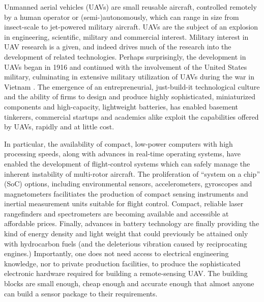 \label{chapter:introduction}

Unmanned aerial vehicles (UAVs) are small reusable aircraft, controlled remotely by a human operator or (semi-)autonomously, which can range in size from insect-scale \cite{Avadhanula2002,Deng2003} to jet-powered military aircraft. UAVs are the subject of an explosion in engineering, scientific, military and commercial interest. Military interest in UAV research is a given, and indeed drives much of the research into the development of related technologies. Perhaps surprisingly, the development in UAVs began in 1916 and continued with the involvement of the United States military, culminating in extensive military utilization of UAVs during the war in Vietnam \cite{Valavanis2007,Cook2007}. The emergence of an entrepreneurial, just-build-it technological culture and the ability of firms to design and produce highly sophisticated, miniaturized components and high-capacity, lightweight batteries, has enabled basement tinkerers, commercial startups and academics alike exploit the capabilities offered by UAVs, rapidly and at little cost.

In particular, the availability of compact, low-power computers with high processing speeds, along with advances in real-time operating systems, have enabled the development of flight-control systems which can safely manage the inherent instability of multi-rotor aircraft. The proliferation of ``system on a chip'' (SoC) options, including environmental sensors, accelerometers, gyroscopes and magnetometers facilitiates the production of compact sensing instruments and inertial measurement units suitable for flight control. Compact, reliable laser rangefinders and spectrometers are becoming available and accessible at affordable prices. Finally, advances in battery technology are finally providing the kind of energy density and light weight that could previously be attained only with hydrocarbon fuels (and the deleterious vibration caused by reciprocating engines.) Importantly, one does not need access to electrical engineering knowledge, nor to private production facilities, to produce the sophisticated electronic hardware required for building a remote-sensing UAV. The building blocks are small enough, cheap enough and accurate enough that almost anyone can build a sensor package to their requirements.

